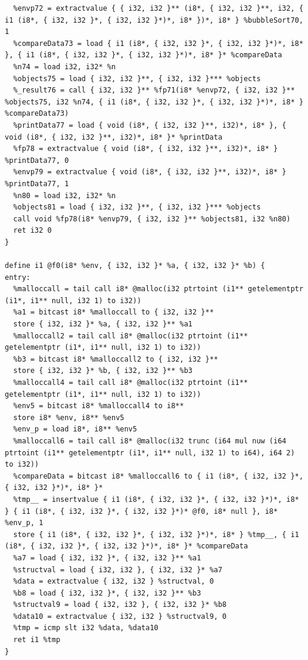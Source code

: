 \documentclass[12pt]{article}
\begin{document}
\begin{mdframed}[hidealllines=true,backgroundcolor=green!10]
\begin{lstlisting}
  %envp72 = extractvalue { { i32, i32 }** (i8*, { i32, i32 }**, i32, { i1 (i8*, { i32, i32 }*, { i32, i32 }*)*, i8* })*, i8* } %bubbleSort70, 1
  %compareData73 = load { i1 (i8*, { i32, i32 }*, { i32, i32 }*)*, i8* }, { i1 (i8*, { i32, i32 }*, { i32, i32 }*)*, i8* }* %compareData
  %n74 = load i32, i32* %n
  %objects75 = load { i32, i32 }**, { i32, i32 }*** %objects
  %_result76 = call { i32, i32 }** %fp71(i8* %envp72, { i32, i32 }** %objects75, i32 %n74, { i1 (i8*, { i32, i32 }*, { i32, i32 }*)*, i8* } %compareData73)
  %printData77 = load { void (i8*, { i32, i32 }**, i32)*, i8* }, { void (i8*, { i32, i32 }**, i32)*, i8* }* %printData
  %fp78 = extractvalue { void (i8*, { i32, i32 }**, i32)*, i8* } %printData77, 0
  %envp79 = extractvalue { void (i8*, { i32, i32 }**, i32)*, i8* } %printData77, 1
  %n80 = load i32, i32* %n
  %objects81 = load { i32, i32 }**, { i32, i32 }*** %objects
  call void %fp78(i8* %envp79, { i32, i32 }** %objects81, i32 %n80)
  ret i32 0
}

define i1 @f0(i8* %env, { i32, i32 }* %a, { i32, i32 }* %b) {
entry:
  %malloccall = tail call i8* @malloc(i32 ptrtoint (i1** getelementptr (i1*, i1** null, i32 1) to i32))
  %a1 = bitcast i8* %malloccall to { i32, i32 }**
  store { i32, i32 }* %a, { i32, i32 }** %a1
  %malloccall2 = tail call i8* @malloc(i32 ptrtoint (i1** getelementptr (i1*, i1** null, i32 1) to i32))
  %b3 = bitcast i8* %malloccall2 to { i32, i32 }**
  store { i32, i32 }* %b, { i32, i32 }** %b3
  %malloccall4 = tail call i8* @malloc(i32 ptrtoint (i1** getelementptr (i1*, i1** null, i32 1) to i32))
  %env5 = bitcast i8* %malloccall4 to i8**
  store i8* %env, i8** %env5
  %env_p = load i8*, i8** %env5
  %malloccall6 = tail call i8* @malloc(i32 trunc (i64 mul nuw (i64 ptrtoint (i1** getelementptr (i1*, i1** null, i32 1) to i64), i64 2) to i32))
  %compareData = bitcast i8* %malloccall6 to { i1 (i8*, { i32, i32 }*, { i32, i32 }*)*, i8* }*
  %tmp__ = insertvalue { i1 (i8*, { i32, i32 }*, { i32, i32 }*)*, i8* } { i1 (i8*, { i32, i32 }*, { i32, i32 }*)* @f0, i8* null }, i8* %env_p, 1
  store { i1 (i8*, { i32, i32 }*, { i32, i32 }*)*, i8* } %tmp__, { i1 (i8*, { i32, i32 }*, { i32, i32 }*)*, i8* }* %compareData
  %a7 = load { i32, i32 }*, { i32, i32 }** %a1
  %structval = load { i32, i32 }, { i32, i32 }* %a7
  %data = extractvalue { i32, i32 } %structval, 0
  %b8 = load { i32, i32 }*, { i32, i32 }** %b3
  %structval9 = load { i32, i32 }, { i32, i32 }* %b8
  %data10 = extractvalue { i32, i32 } %structval9, 0
  %tmp = icmp slt i32 %data, %data10
  ret i1 %tmp
}


\end{lstlisting}
\end{mdframed}
\end{document}
